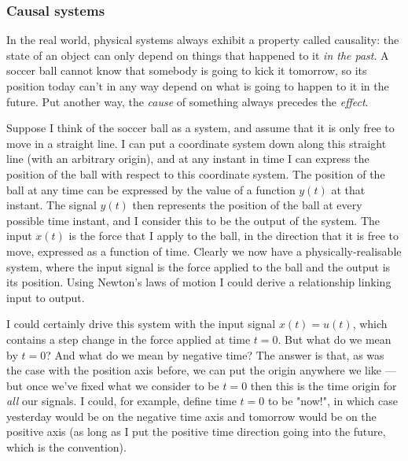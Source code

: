 \documentclass[10pt]{beamer}
\begin{document}
\subsubsection{Causal systems}

In the real world, physical systems always exhibit a property called causality:  the state of an object can only depend on things that happened to it {\em in the past}.  A soccer ball cannot know that somebody is going to kick it tomorrow, so its position today can't in any way depend on what is going to happen to it in the future.  Put another way, the {\em cause} of something always precedes the {\em effect}.  

Suppose I think of the soccer ball as a system, and assume that it is only free to move in a straight line.  I can put a coordinate system down along this straight line (with an arbitrary origin), and at any instant in time I can express the position of the ball with respect to this coordinate system.  The position of the ball at any time can be expressed by the value of a function $y(t)$ at that instant.  The signal $y(t)$ then represents the position of the ball at every possible time instant, and I consider this to be the output of the system.  The input $x(t)$ is the force that I apply to the ball, in the direction that it is free to move, expressed as a function of time.  Clearly we now have a physically-realisable system, where the input signal is the force applied to the ball and the output is its position.  Using Newton's laws of motion I could derive a relationship linking input to output.

I could certainly drive this system with the input signal $x(t) = u(t)$, which contains a step change in the force applied at time $t=0$.  But what do we mean by $t=0$?  And what do we mean by negative time?  The answer is that, as was the case with the position axis before, we can put the origin anywhere we like --- but once we've fixed what we consider to be $t=0$ then this is the time origin for {\em all} our signals.  I could, for example, define time $t=0$ to be "now!", in which case yesterday would be on the negative time axis and tomorrow would be on the positive axis (as long as I put the positive time direction going into the future, which is the convention).
\end{document}
